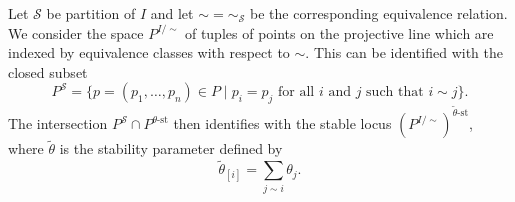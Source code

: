 \documentclass[11pt, a4paper]{amsart}
\begin{document}
	Let \(\mathcal{S}\) be partition of \(I\) and let \({\sim} = {\sim}_\mathcal{S}\) be the corresponding equivalence relation. We consider the space \(P^{I/\sim}\) of tuples of points on the projective line which are indexed by equivalence classes with respect to \(\sim\). This can be identified with the closed subset 
	\[
		P^\mathcal{S} = \{ p = (p_1,\ldots,p_n) \in P \mid p_i = p_j \text{ for all \(i\) and \(j\) such that } i \sim j \}. 
	\]
	The intersection \(P^\mathcal{S} \cap P^{\theta\text{-st}}\) then identifies with the stable locus \({(P^{I/\sim})}^{\tilde{\theta}\text{-st}}\), where \(\tilde{\theta}\) is the stability parameter defined by
	\[
		\tilde{\theta}_{[i]} = \sum_{j \sim i} \theta_j.
	\]
\end{document}
